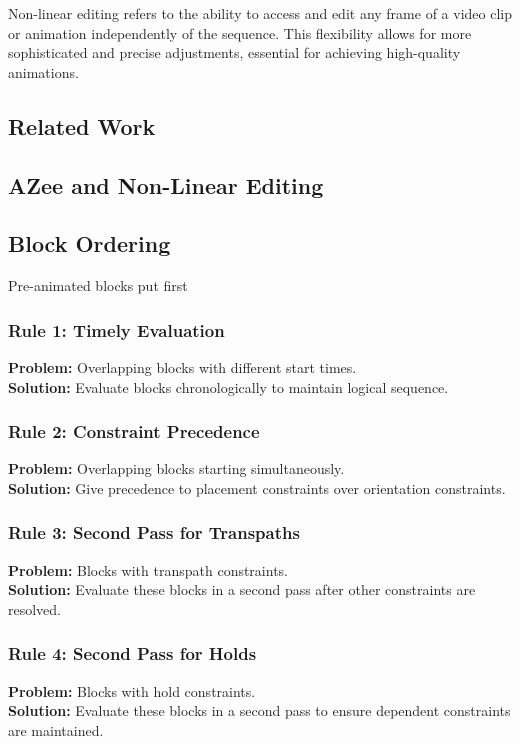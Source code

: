 \documentclass[../../main.tex]{subfiles}
\begin{document}
Non-linear editing refers to the ability to access and edit any frame of a video clip or animation independently of the sequence. This flexibility allows for more sophisticated and precise adjustments, essential for achieving high-quality animations.

\subsection{Related Work}

\subsection{AZee and Non-Linear Editing}

\subsection{Block Ordering}

Pre-animated blocks put first

\subsubsection{Rule 1: Timely Evaluation}
\textbf{Problem:} Overlapping blocks with different start times.\\
\textbf{Solution:} Evaluate blocks chronologically to maintain logical sequence.

\subsubsection{Rule 2: Constraint Precedence}
\textbf{Problem:} Overlapping blocks starting simultaneously.\\
\textbf{Solution:} Give precedence to placement constraints over orientation constraints.

\subsubsection{Rule 3: Second Pass for Transpaths}
\textbf{Problem:} Blocks with transpath constraints.\\
\textbf{Solution:} Evaluate these blocks in a second pass after other constraints are resolved.

\subsubsection{Rule 4: Second Pass for Holds}
\textbf{Problem:} Blocks with hold constraints.\\
\textbf{Solution:} Evaluate these blocks in a second pass to ensure dependent constraints are maintained.
\end{document}
